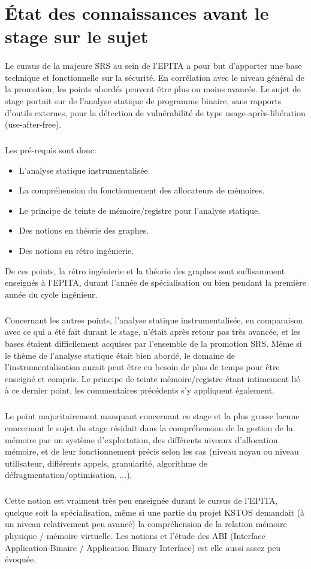 \subparagraph{}

\section*{État des connaissances avant le stage sur le sujet}
\paragraph{}
Le cursus de la majeure SRS au sein de l'EPITA a pour but d'apporter une base technique et fonctionnelle
sur la sécurité. En corrélation avec le niveau général de la promotion, les points abordés peuvent être
plus ou moins avancés. Le sujet de stage portait sur de l'analyse statique de programme binaire, sans rapports
d'outils externes, pour la détection de vulnérabilité de type usage-après-libération (use-after-free).
\subparagraph{}
Les pré-requis sont donc:
\begin{itemize}
\item L'analyse statique instrumentalisée.
\item La compréhension du fonctionnement des allocateurs de mémoires.
\item Le principe de teinte de mémoire/registre pour l'analyse statique.
\item Des notions en théorie des graphes.
\item Des notions en rétro ingénierie.
\end{itemize}

De ces points, la rétro ingénierie et la théorie des graphes sont suffisamment enseignés à l'EPITA,
durant l'année de spécialisation ou bien pendant la première année du cycle ingénieur.
\subparagraph{}
Concernant les autres points, l'analyse statique instrumentalisée, en comparaison avec ce qui a été
fait durant le stage, n'était après retour pas très avancée, et les bases étaient difficilement acquises par
l'ensemble de la promotion SRS. Même si le thème de l'analyse statique était bien abordé, le domaine de l'instrumentalisation
aurait peut être eu besoin de plus de temps pour être enseigné et compris. Le principe de teinte mémoire/registre étant intimement
lié à ce dernier point, les commentaires précédents s'y appliquent également.
\subparagraph{}
Le point majoritairement manquant concernant ce stage et la plus grosse lacune concernant le sujet du stage résidait dans la compréhension de
la gestion de la mémoire par un système d'exploitation, des différents niveaux d'allocation mémoire, et de leur fonctionnement précis
selon les cas (niveau noyau ou niveau utilisateur, différents appels, granularité, algorithme de défragmentation/optimisation, ...).
\subparagraph{}
Cette notion est vraiment très peu enseignée durant le cursus de l'EPITA, quelque soit la spécialisation, même si une partie du projet KSTOS
demandait (à un niveau relativement peu avancé) la compréhension de la relation mémoire physique / mémoire virtuelle.
Les notions et l'étude des ABI (Interface Application-Binaire / Application Binary Interface) est elle aussi assez peu évoquée.
\subparagraph{}

